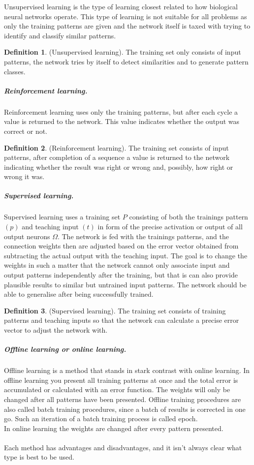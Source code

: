 \documentclass[pdftex,a4paper,12pt,twoside]{report}
\theoremstyle{plain} \newtheorem{theorem}{Theorem} \newtheorem{proposition}{Proposition} \newtheorem{lemma}{Lemma} \newtheorem*{corollary}{Corollary}
\theoremstyle{definition} \newtheorem{definition}{Definition} \newtheorem{conjecture}{Conjecture} \newtheorem*{example}{Example} \newtheorem{algorithm}{Algorithm}
\theoremstyle{remark} \newtheorem*{remark}{Remark} \newtheorem*{note}{Note} \newtheorem{case}{Case}
\begin{document}
Unsupervised learning is the type of learning closest related to how biological neural networks operate. This type of learning is not suitable for all problems as only the training patterns are given and the network itself is taxed with trying to identify and classify similar patterns.
\begin{definition}(Unsupervised learning). The training set only consists of input
patterns, the network tries by itself to detect similarities and to generate pattern
classes.
\end{definition}
\subparagraph{Reinforcement learning.}
Reinforcement learning uses only the training patterns, but after each cycle a value is returned to the network. This value indicates whether the output was correct or not.
\begin{definition}
(Reinforcement learning). The training set consists of input patterns,
after completion of a sequence a value is returned to the network indicating whether
the result was right or wrong and, possibly, how right or wrong it was.
\end{definition}
\subparagraph{Supervised learning.}
Supervised learning uses a training set $P$ consisting of both the trainings pattern $(p)$ and teaching input $(t)$ in form of the precise activation or output of all output neurons $\Omega$. The network is fed with the trainings patterns, and the connection weights then are adjusted based on the error vector obtained from subtracting the actual output with the teaching input. The goal is to change the weights in such a matter that the network cannot only associate input and output patterns independently after the training, but that is can also provide plausible results to similar but untrained input patterns. The network should be able to generalise after being successfully trained.
\begin{definition}
(Supervised learning). The training set consists of training patterns and teaching inputs so that the network can calculate a precise error vector to adjust the network with.
\end{definition}
\subparagraph{Offline learning or online learning.}
Offline learning is a method that stands in stark contrast with online learning. In offline learning you present all training patterns at once and the total error is accumulated or calculated with an error function. The weights will only be changed after all patterns have been presented. Offline training procedures are also called batch training procedures, since a batch of results is corrected in one go. Such an iteration of a batch training process is called epoch.\\In online learning the weights are changed after every pattern presented.\\\\Each method has advantages and disadvantages, and it isn't always clear what type is best to be used. 
\end{document}
